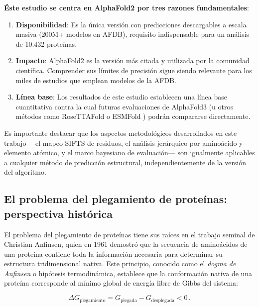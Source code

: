 \textbf{\'Este estudio se centra en AlphaFold2 por tres razones fundamentales}:
\begin{enumerate}
    \item \textbf{Disponibilidad}: Es la \'unica versi\'on con predicciones descargables
    a escala masiva (200M+ modelos en AFDB), requisito indispensable para un an\'alisis
    de 10.432 prote\'inas.
    \item \textbf{Impacto}: AlphaFold2 es la versi\'on m\'as citada y utilizada por la
    comunidad cient\'ifica. Comprender sus l\'imites de precisi\'on sigue siendo relevante
    para los miles de estudios que emplean modelos de la AFDB.
    \item \textbf{L\'inea base}: Los resultados de este estudio establecen una l\'inea base
    cuantitativa contra la cual futuras evaluaciones de AlphaFold3 (u otros m\'etodos como
    RoseTTAFold \citep{baek2021accurate} o ESMFold \citep{lin2023evolutionary}) podr\'an
    compararse directamente.
\end{enumerate}

Es importante destacar que los aspectos metodol\'ogicos desarrollados en este trabajo
---el mapeo SIFTS de residuos, el an\'alisis jer\'arquico por amino\'acido y elemento at\'omico,
y el marco bayesiano de evaluaci\'on--- son igualmente aplicables a cualquier m\'etodo de
predicci\'on estructural, independientemente de la versi\'on del algoritmo.

\subsection{El problema del plegamiento de prote\'inas: perspectiva hist\'orica}
\label{subsec:problema_plegamiento}

El problema del plegamiento de prote\'inas tiene sus ra\'ices en el trabajo seminal de Christian Anfinsen, quien en 1961 demostr\'o que la secuencia de amino\'acidos de una prote\'ina contiene toda la informaci\'on necesaria para determinar su estructura tridimensional nativa. Este principio, conocido como el \textit{dogma de Anfinsen} o hip\'otesis termodin\'amica, establece que la conformaci\'on nativa de una prote\'ina corresponde al m\'inimo global de energ\'ia libre de Gibbs del sistema:

\begin{equation}
    \Delta G_{\text{plegamiento}} = G_{\text{plegada}} - G_{\text{desplegada}} < 0\,.
    \label{eq:energia_plegamiento}
\end{equation}

